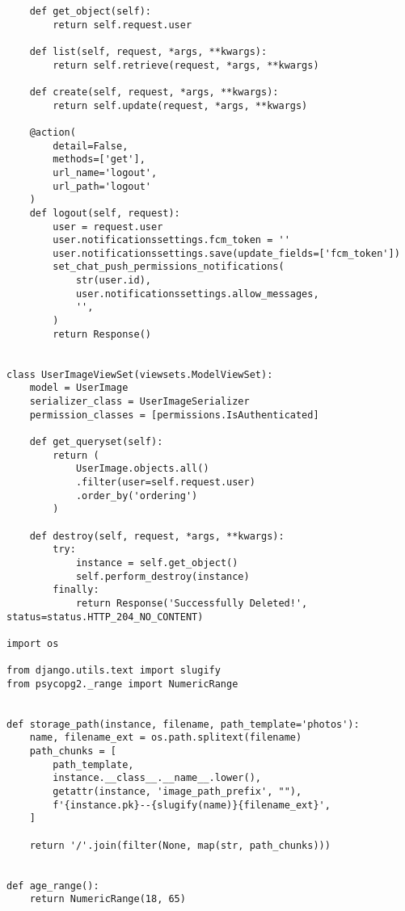 \begin{lstlisting}
    def get_object(self):
        return self.request.user

    def list(self, request, *args, **kwargs):
        return self.retrieve(request, *args, **kwargs)

    def create(self, request, *args, **kwargs):
        return self.update(request, *args, **kwargs)

    @action(
        detail=False,
        methods=['get'],
        url_name='logout',
        url_path='logout'
    )
    def logout(self, request):
        user = request.user
        user.notificationssettings.fcm_token = ''
        user.notificationssettings.save(update_fields=['fcm_token'])
        set_chat_push_permissions_notifications(
            str(user.id),
            user.notificationssettings.allow_messages,
            '',
        )
        return Response()


class UserImageViewSet(viewsets.ModelViewSet):
    model = UserImage
    serializer_class = UserImageSerializer
    permission_classes = [permissions.IsAuthenticated]

    def get_queryset(self):
        return (
            UserImage.objects.all()
            .filter(user=self.request.user)
            .order_by('ordering')
        )

    def destroy(self, request, *args, **kwargs):
        try:
            instance = self.get_object()
            self.perform_destroy(instance)
        finally:
            return Response('Successfully Deleted!', status=status.HTTP_204_NO_CONTENT)

import os

from django.utils.text import slugify
from psycopg2._range import NumericRange


def storage_path(instance, filename, path_template='photos'):
    name, filename_ext = os.path.splitext(filename)
    path_chunks = [
        path_template,
        instance.__class__.__name__.lower(),
        getattr(instance, 'image_path_prefix', ""),
        f'{instance.pk}--{slugify(name)}{filename_ext}',
    ]

    return '/'.join(filter(None, map(str, path_chunks)))


def age_range():
    return NumericRange(18, 65)

\end{lstlisting}
